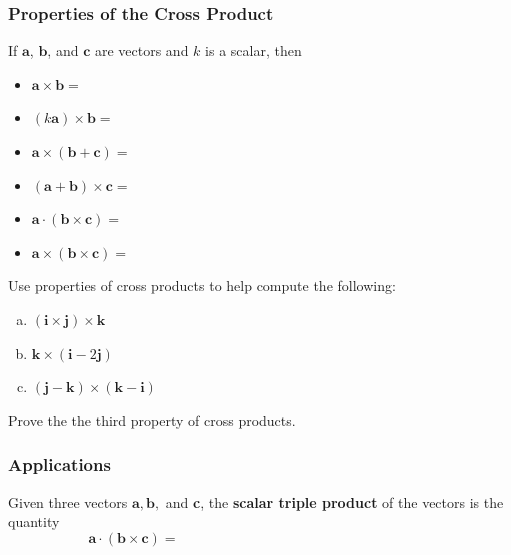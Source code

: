 \documentclass[notes]{subfiles}
\begin{document}
			\newpage
			
	\subsubsection*{Properties of the Cross Product}	
		\begin{rmk}
			If $\textbf{a}$, $\textbf{b}$, and $\textbf{c}$ are vectors and $k$ is a scalar, then\\[15pt]
			\begin{itemize}
				\setlength\itemsep{15pt}
				\item $\textbf{a}\times \textbf{b} = $
				\item $(k\textbf{a})\times \textbf{b} = $
				\item $\textbf{a}\times (\textbf{b} + \textbf{c}) = $
				\item $(\textbf{a}+\textbf{b}) \times \textbf{c} = $
				\item $\textbf{a}\cdot (\textbf{b}\times \textbf{c}) = $
				\item $\textbf{a}\times (\textbf{b}\times\textbf{c}) = $
			\end{itemize}
		\end{rmk}
		
		\begin{ex}
			Use properties of cross products to help compute the following:
			\begin{enumerate}[(a)]
				\item $(\textbf{i}\times\textbf{j})\times\textbf{k}$
					
				\item $\textbf{k}\times (\textbf{i}-2\textbf{j})$
					
				\item $(\textbf{j}-\textbf{k})\times (\textbf{k}-\textbf{i})$
			\end{enumerate}
		\end{ex}
			\newpage
			
		\begin{ex}
			Prove the the third property of cross products.
		\end{ex}
			
	\subsubsection*{Applications}
		\begin{defn}
			Given three vectors $\textbf{a}, \textbf{b},$ and \textbf{c}, the \textbf{scalar triple product} of the vectors is the quantity\\[15pt]
				\[\textbf{a}\cdot (\textbf{b}\times \textbf{c}) = \hspace{3in}\]
		\end{defn}
		
\end{document}
